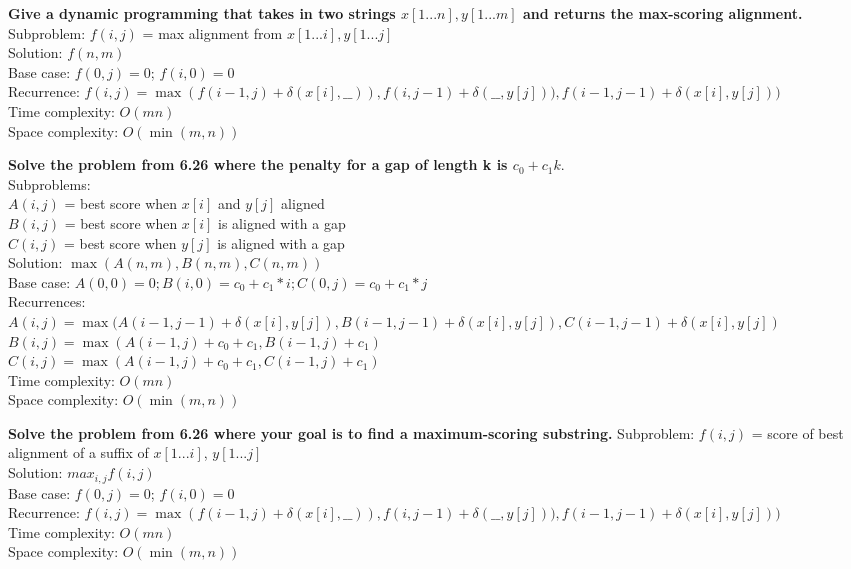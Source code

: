\begin{problem}{6.26}
    \textbf{Give a dynamic programming that takes in two strings $x[1...n], y[1...m]$ and returns the max-scoring alignment.} \\
    Subproblem: $f(i, j)$ = max alignment from $x[1...i], y[1...j]$ \\
    Solution: $f(n, m)$ \\
    Base case: $f(0, j) = 0$; $f(i, 0) = 0$ \\
    Recurrence: $f(i, j) = \max(f(i - 1, j) + \delta(x[i],\_\_)), f(i, j - 1) + \delta(\_\_, y[j])), f(i - 1, j - 1) + \delta(x[i], y[j]))$ \\
    Time complexity: $O(mn)$ \\
    Space complexity: $O(\min(m, n))$
\end{problem}

\newpage
\begin{problem}{6.27}
    \textbf{Solve the problem from 6.26 where the penalty for a gap of length k is $c_0 + c_1k$}. \\
    Subproblems: 
        \\ $A(i, j)$ = best score when $x[i]$ and $y[j]$ aligned \\
        $B(i, j)$ = best score when $x[i]$ is aligned with a gap \\
        $C(i, j)$ = best score when $y[j]$ is aligned with a gap \\
    Solution: $\max(A(n, m), B(n, m), C(n, m))$ \\
    Base case: $A(0, 0) = 0; B(i, 0) = c_0 + c_1 * i; C(0, j) = c_0 + c_1 * j$ \\
    Recurrences: \\
    $A(i, j) = \max(A(i - 1, j - 1) + \delta(x[i], y[j]), B(i - 1, j - 1) + \delta(x[i], y[j]), C(i - 1, j - 1) + \delta(x[i], y[j])$ \\
    $B(i,  j) = \max(A(i - 1, j) + c_0 + c_1, B(i - 1, j) + c_1)$ \\
    $C(i,  j) = \max(A(i - 1, j) + c_0 + c_1, C(i - 1, j) + c_1)$ \\
    Time complexity: $O(mn)$ \\
    Space complexity: $O(\min(m, n))$
\end{problem}

\begin{problem}
    \textbf{Solve the problem from 6.26 where your goal is to find a maximum-scoring substring.}
    Subproblem: $f(i, j)$ = score of best alignment of a suffix of $x[1...i]$, $y[1...j]$ \\
    Solution: $max_{i, j} f(i, j)$ \\
    Base case: $f(0, j) = 0$; $f(i, 0) = 0$ \\
    Recurrence: $f(i, j) = \max(f(i - 1, j) + \delta(x[i],\_\_)), f(i, j - 1) + \delta(\_\_, y[j])), f(i - 1, j - 1) + \delta(x[i], y[j]))$ \\
    Time complexity: $O(mn)$ \\
    Space complexity: $O(\min(m, n))$
\end{problem}
